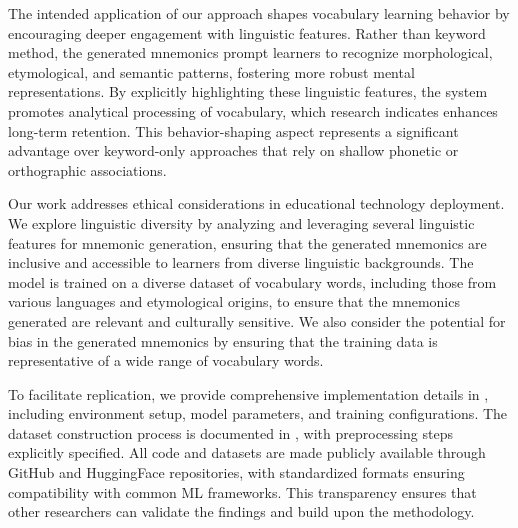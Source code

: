  The intended application of our approach shapes vocabulary learning behavior by encouraging deeper engagement with linguistic features. Rather than keyword method, the generated mnemonics prompt learners to recognize morphological, etymological, and semantic patterns, fostering more robust mental representations. By explicitly highlighting these linguistic features, the system promotes analytical processing of vocabulary, which research indicates enhances long-term retention. This behavior-shaping aspect represents a significant advantage over keyword-only approaches that rely on shallow phonetic or orthographic associations.


 Our work addresses ethical considerations in educational technology deployment. We explore linguistic diversity by analyzing and leveraging several linguistic features for mnemonic generation, ensuring that the generated mnemonics are inclusive and accessible to learners from diverse linguistic backgrounds. The model is trained on a diverse dataset of vocabulary words, including those from various languages and etymological origins, to ensure that the mnemonics generated are relevant and culturally sensitive. We also consider the potential for bias in the generated mnemonics by ensuring that the training data is representative of a wide range of vocabulary words.

 To facilitate replication, we provide comprehensive implementation details in , including environment setup, model parameters, and training configurations. The dataset construction process is documented in , with preprocessing steps explicitly specified. All code and datasets are made publicly available through GitHub and HuggingFace repositories, with standardized formats ensuring compatibility with common ML frameworks. This transparency ensures that other researchers can validate the findings and build upon the methodology.
